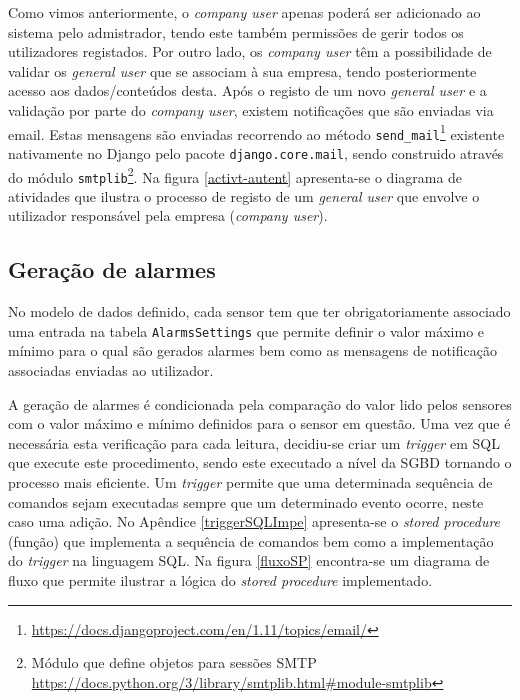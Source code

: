 Como vimos anteriormente, o \textit{company user} apenas poderá ser adicionado ao sistema pelo admistrador, tendo este também permissões de gerir todos os utilizadores registados. Por outro lado, os \textit{company user} têm a possibilidade de validar os \textit{general user} que se associam à sua empresa, tendo posteriormente acesso aos dados/conteúdos desta. Após o registo de um novo \textit{general user} e a validação por parte do \textit{company user}, existem notificações que são enviadas via email. Estas mensagens são enviadas recorrendo ao método \texttt{send\_mail}\footnote{\url{https://docs.djangoproject.com/en/1.11/topics/email/}} existente nativamente no Django pelo pacote \texttt{django.core.mail}, sendo construido através do módulo \texttt{smtplib}\footnote{Módulo que define objetos para sessões \ac{SMTP} \url{https://docs.python.org/3/library/smtplib.html\#module-smtplib}}. Na figura \ref{activt-autent} apresenta-se o diagrama de atividades que ilustra o processo de registo de um \textit{general user} que envolve o utilizador responsável pela empresa (\textit{company user}). 








\subsection{Geração de alarmes}

No modelo de dados definido, cada sensor tem que ter obrigatoriamente associado uma entrada na tabela \texttt{AlarmsSettings} que permite definir o valor máximo e mínimo para o qual são gerados alarmes bem como as mensagens de notificação associadas enviadas ao utilizador. 

A geração de alarmes é condicionada pela comparação do valor lido pelos sensores com o valor máximo e mínimo definidos para o sensor em questão. Uma vez que é necessária esta verificação para cada leitura, decidiu-se criar um \textit{trigger} em \ac{SQL} que execute este procedimento, sendo este executado a nível da \ac{SGBD} tornando o processo mais eficiente. Um \textit{trigger} permite que uma determinada sequência de comandos sejam executadas sempre que um determinado evento ocorre, neste caso uma adição. No Apêndice \ref{triggerSQLImpe} apresenta-se o \textit{stored procedure} (função) que implementa a sequência de comandos bem como a implementação do \textit{trigger} na linguagem \ac{SQL}. Na figura \ref{fluxoSP} encontra-se um diagrama de fluxo que permite ilustrar a lógica do \textit{stored procedure} implementado. 



